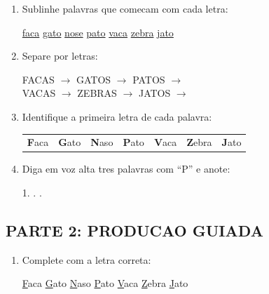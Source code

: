 \begin{exercicio}
\begin{enumerate}
  \item Sublinhe palavras que comecam com cada letra:
  \begin{center}
  \uline{faca} \quad \uline{gato} \quad \uline{nose} \quad \uline{pato} \quad \uline{vaca} \quad \uline{zebra} \quad \uline{jato}
  \end{center}

  \item Separe por letras:
  \begin{center}
  FACAS $\rightarrow$ \underline{\hspace{2cm}} \quad GATOS $\rightarrow$ \underline{\hspace{2cm}} \quad PATOS $\rightarrow$ \underline{\hspace{2cm}} \\
  VACAS $\rightarrow$ \underline{\hspace{2cm}} \quad ZEBRAS $\rightarrow$ \underline{\hspace{2cm}} \quad JATOS $\rightarrow$ \underline{\hspace{2cm}}
  \end{center}

  \item Identifique a primeira letra de cada palavra:
  \begin{center}
  \begin{tabular}{ccccccc}
  \textbf{F}aca & \textbf{G}ato & \textbf{N}aso & \textbf{P}ato & \textbf{V}aca & \textbf{Z}ebra & \textbf{J}ato
  \end{tabular}
  \end{center}

  \item Diga em voz alta tres palavras com ``P'' e anote:
  \begin{center}
  1. \underline{\hspace{4cm}} . \underline{\hspace{4cm}} . \underline{\hspace{4cm}}
  \end{center}
\end{enumerate}

\subsection*{PARTE 2: PRODUCAO GUIADA}

\begin{enumerate}[resume]
  \item Complete com a letra correta:
  \begin{center}
  \underline{F}aca \quad \underline{G}ato \quad \underline{N}aso \quad \underline{P}ato \quad \underline{V}aca \quad \underline{Z}ebra \quad \underline{J}ato
  \end{center}


\end{enumerate}
\end{exercicio}
